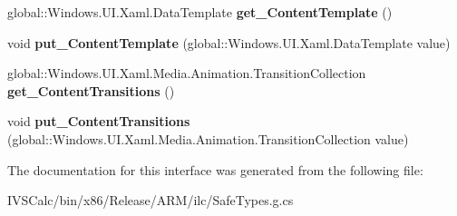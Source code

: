 \begin{DoxyCompactItemize}
global\+::\+Windows.\+U\+I.\+Xaml.\+Data\+Template {\bfseries get\+\_\+\+Content\+Template} ()
\item 
\mbox{\label{interface_windows_1_1_u_i_1_1_xaml_1_1_controls_1_1_i_content_control_ab8635fb05ae89dd2ff4d0697e5c78b84}} 
void {\bfseries put\+\_\+\+Content\+Template} (global\+::\+Windows.\+U\+I.\+Xaml.\+Data\+Template value)
\item 
\mbox{\label{interface_windows_1_1_u_i_1_1_xaml_1_1_controls_1_1_i_content_control_aa51222b3d15db7740854e4ddbad68fd3}} 
global\+::\+Windows.\+U\+I.\+Xaml.\+Media.\+Animation.\+Transition\+Collection {\bfseries get\+\_\+\+Content\+Transitions} ()
\item 
\mbox{\label{interface_windows_1_1_u_i_1_1_xaml_1_1_controls_1_1_i_content_control_a1c0aac2a725d08d1f7e467ea2dd8afd3}} 
void {\bfseries put\+\_\+\+Content\+Transitions} (global\+::\+Windows.\+U\+I.\+Xaml.\+Media.\+Animation.\+Transition\+Collection value)
\end{DoxyCompactItemize}


The documentation for this interface was generated from the following file\+:\begin{DoxyCompactItemize}
\item 
I\+V\+S\+Calc/bin/x86/\+Release/\+A\+R\+M/ilc/Safe\+Types.\+g.\+cs\end{DoxyCompactItemize}
